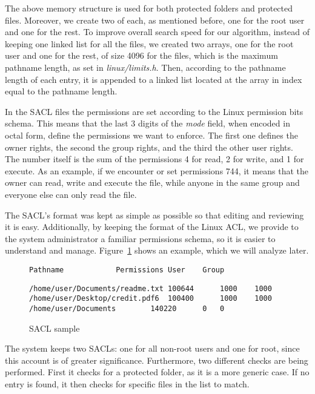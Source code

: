 \par The above memory structure is used for both protected folders and protected files. Moreover, we create two of each, as mentioned before, one for the root user and one for the rest. To improve overall search speed for our algorithm, instead of keeping one linked list for all the files, we created two arrays, one for the root user and one for the rest, of size 4096 for the files, which is the maximum pathname length, as set in \textit{linux/limits.h}. Then, according to the pathname length of each entry, it is appended to a linked list located at the array in index equal to the pathname length. 

\par In the \ac{SACL} files the permissions are set according to the Linux permission bits schema. This means that the last 3 digits of the \textit{mode} field, when encoded in octal form, define the permissions we want to enforce. The first one defines the owner rights, the second the group rights, and the third the other user rights. The number itself is the sum of the permissions 4 for read, 2 for write, and 1 for execute. As an example, if we encounter or set permissions 744, it means that the owner can read, write and execute the file, while anyone in the same group and everyone else can only read the file.

\par The \ac{SACL}'s format was kept as simple as possible so that editing and reviewing it is easy. Additionally, by keeping the format of the Linux \ac{ACL}, we provide to the system administrator a familiar permissions schema, so it is easier to understand and manage. Figure~\ref{fig:sacl} shows an example, which we will analyze later.

\begin{figure}[ht]
	\centering
	\begin{lstlisting}
Pathname			Permissions	User	Group
	\end{lstlisting}
	\footnotesize{\selectfont 
	\begin{lstlisting}
/home/user/Documents/readme.txt	100644		1000	1000
/home/user/Desktop/credit.pdf6	100400		1000	1000
/home/user/Documents		140220		0	0
	\end{lstlisting}}
	\caption{\ac{SACL} sample}
	\label{fig:sacl}
\end{figure}

\par The system keeps two \acp{SACL}: one for all non-root users and one for root, since this account is of greater significance. Furthermore, two different checks are being performed. First it checks for a protected folder, as it is a more generic case. If no entry is found, it then checks for specific files in the list to match. 

